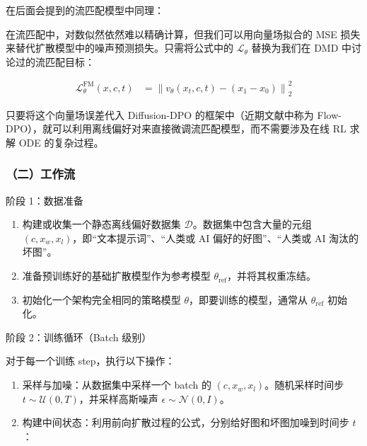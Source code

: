 在后面会提到的流匹配模型中同理：

在流匹配中，对数似然依然难以精确计算，但我们可以用向量场拟合的 MSE 损失来替代扩散模型中的噪声预测损失。只需将公式中的 \(\mathcal{L}_\theta\) 替换为我们在 DMD 中讨论过的流匹配目标：

\[
\begin{aligned}
\mathcal{L}^{\mathrm{FM}}_\theta(x,c,t)
&=\left\lVert v_\theta(x_t,c,t)-(x_1-x_0)\right\rVert_2^2
\end{aligned}
\]

只要将这个向量场误差代入 Diffusion-DPO 的框架中（近期文献中称为 Flow-DPO），就可以利用离线偏好对来直接微调流匹配模型，而不需要涉及在线 RL 求解 ODE 的复杂过程。

\hypertarget{ux4e8cux5de5ux4f5cux6d41-2}{%
\subsubsection{（二）工作流}\label{ux4e8cux5de5ux4f5cux6d41-2}}

阶段 1：数据准备

\begin{enumerate}
\def\labelenumi{\arabic{enumi}.}
\tightlist
\item
  构建或收集一个静态离线偏好数据集 \(\mathcal{D}\)。数据集中包含大量的元组 \((c,x_w,x_l)\)，即``文本提示词''、``人类或 AI 偏好的好图''、``人类或 AI 淘汰的坏图''。
\item
  准备预训练好的基础扩散模型作为参考模型 \(\theta_{\mathrm{ref}}\)，并将其权重冻结。
\item
  初始化一个架构完全相同的策略模型 \(\theta\)，即要训练的模型，通常从 \(\theta_{\mathrm{ref}}\) 初始化。
\end{enumerate}

阶段 2：训练循环（Batch 级别）

对于每一个训练 step，执行以下操作：

\begin{enumerate}
\def\labelenumi{\arabic{enumi}.}
\tightlist
\item
  采样与加噪：从数据集中采样一个 batch 的 \((c,x_w,x_l)\)。随机采样时间步 \(t\sim\mathcal{U}(0,T)\)，并采样高斯噪声 \(\epsilon\sim\mathcal{N}(0,I)\)。
\item
{}
  构建中间状态：利用前向扩散过程的公式，分别给好图和坏图加噪到时间步 \(t\)：
\end{enumerate}

